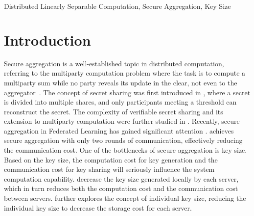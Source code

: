 \documentclass[conference,letterpaper]{IEEEtran}
\begin{document}
\begin{IEEEkeywords}
    Distributed Linearly Separable Computation, Secure Aggregation, Key Size    
\end{IEEEkeywords}
    



\section{Introduction}

Secure aggregation is a well-established topic in distributed computation, referring to the multiparty computation problem where the task is to compute a multiparty sum while no party reveals its update in the clear, not even to the aggregator~\cite{Bonawitz_Secure_Aggregation}. The concept of secret sharing was first introduced in \cite{shamir1979share}, where a secret is divided into multiple shares, and only participants meeting a threshold can reconstruct the secret. %
The complexity of verifiable secret sharing and its extension to multiparty computation were further studied in \cite{pedersen1991non, cramer2000complexity, ChaumMultiparty1988,yue2016healthcare}. Recently, secure aggregation in Federated Learning has gained significant attention \cite{fereidooni2021safe,yang2021lightsecagg,choi2020communication, jahani2022swiftagg,zhao2022information}.\cite{yang2021lightsecagg} achieves secure aggregation with only two rounds of communication, effectively reducing the communication cost.
 One of the bottlenecks of secure aggregation is key size. Based on the key size, the computation cost for key generation and the communication cost for key sharing will seriously influence the system computation capability. \cite{choi2020communication, jahani2022swiftagg} decrease the key size generated locally by each server, which in turn reduces both the computation cost and the communication cost between servers.\cite{zhao2022information} further explores the concept of individual key size, reducing the individual key size to decrease the storage cost for each server.


\end{document}

